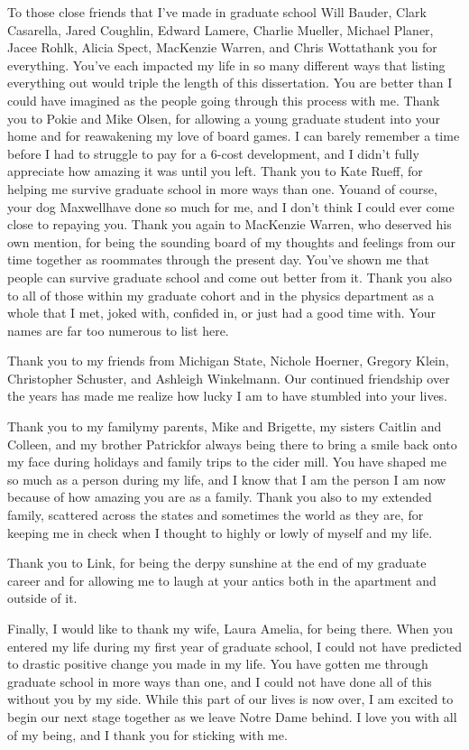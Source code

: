 \begin{acknowledge}

To those close friends that I've made in graduate school\textemdash{}
Will Bauder, Clark Casarella, Jared Coughlin, Edward Lamere, Charlie
Mueller, Michael Planer, Jacee Rohlk, Alicia Spect, MacKenzie Warren,
and Chris Wotta\textemdash{}thank you for everything. You've each
impacted my life in so many different ways that listing everything out
would triple the length of this dissertation. You are better than I
could have imagined as the people going through this process with me.
Thank you to Pokie and Mike Olsen, for allowing a young graduate student
into your home and for reawakening my love of board games. I can barely
remember a time before I had to struggle to pay for a 6-cost
development, and I didn't fully appreciate how amazing it was until you
left. Thank you to Kate Rueff, for helping me survive graduate school in
more ways than one. You\textemdash{}and of course, your dog
Maxwell\textemdash{}have done so much for me, and I don't think I could
ever come close to repaying you. Thank you again to MacKenzie Warren,
who deserved his own mention, for being the sounding board of my
thoughts and feelings from our time together as roommates through the
present day. You've shown me that people can survive graduate school and
come out better from it. Thank you also to all of those within my
graduate cohort and in the physics department as a whole that I met,
joked with, confided in, or just had a good time with. Your names are
far too numerous to list here.

Thank you to my friends from Michigan State, Nichole Hoerner, Gregory
Klein, Christopher Schuster, and Ashleigh Winkelmann. Our continued
friendship over the years has made me realize how lucky I am to have
stumbled into your lives.

Thank you to my family\textemdash{}my parents, Mike and Brigette, my
sisters Caitlin and Colleen, and my brother Patrick\textemdash{}for
always being there to bring a smile back onto my face during holidays
and family trips to the cider mill. You have shaped me so much as a
person during my life, and I know that I am the person I am now because
of how amazing you are as a family. Thank you also to my extended
family, scattered across the states and sometimes the world as they are,
for keeping me in check when I thought to highly or lowly of myself and
my life.

Thank you to Link, for being the derpy sunshine at the end of my
graduate career and for allowing me to laugh at your antics both in the
apartment and outside of it.

Finally, I would like to thank my wife, Laura Amelia, for being there.
When you entered my life during my first year of graduate school, I
could not have predicted to drastic positive change you made in my life.
You have gotten me through graduate school in more ways than one, and I
could not have done all of this without you by my side. While this part
of our lives is now over, I am excited to begin our next stage together
as we leave Notre Dame behind. I love you with all of my being, and I
thank you for sticking with me.

\end{acknowledge}

